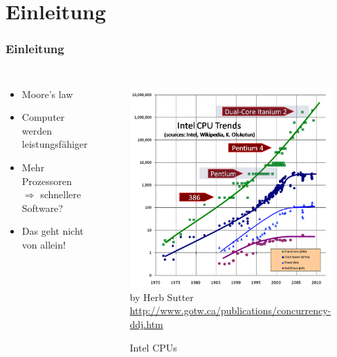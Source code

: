 \section{Einleitung}

\begin{frame}[c]
    \frametitle{Einleitung}
    \begin{columns}
        \begin{itemize}
            \item Moore's law
            \item Computer werden leistungsfähiger
            \item Mehr Prozessoren \\
                $\Rightarrow$ schnellere Software?
            \item Das geht nicht von allein!
        \end{itemize}
        \begin{figure}
            \centering
            \copyrightbox%
                {\includegraphics[height=0.7\textheight]{content/images/CPU}}%
                {by Herb Sutter \url{http://www.gotw.ca/publications/concurrency-ddj.htm}}
            \caption{Intel CPUs}
        \end{figure}
    \end{columns}
\end{frame}
